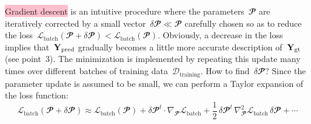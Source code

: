 \documentclass{article}
\begin{document}
\begin{enumerate}
\colorbox{pink}{Gradient descent} is an intuitive procedure where the parameters~$\mathbfcal{P}$ are iteratively corrected by a small vector~$\delta \mathbfcal{P} \ll \mathbfcal{P}$ carefully chosen so as to reduce the loss~$\mathcal{L}_\text{batch} (\mathbfcal{P} + \delta \mathbfcal{P} ) < \mathcal{L}_\text{batch} (\mathbfcal{P})$. Obviously, a decrease in the loss implies that~${\bf Y}_\text{pred}$ gradually becomes a little more accurate description of~${\bf Y}_\text{gt}$ (see point~3).  The minimization is implemented by repeating this update many times over different batches of training data~$\mathcal{D}_\text{training}$.  How to find~$\delta \mathbfcal{P}$?  Since the parameter update is assumed to be small, we can perform a Taylor expansion of the loss function:
\begin{equation*}
\mathcal{L}_\text{batch} ( \mathbfcal{P} + \delta \mathbfcal{P} ) \approx \mathcal{L}_\text{batch} ( \mathbfcal{P} ) + \delta \mathbfcal{P}^t \cdot \nabla_\mathbfcal{P} \mathcal{L}_\text{batch} + \frac{1}{2} \, \delta \mathbfcal{P}^t \, \nabla^2_\mathbfcal{P} \mathcal{L}_\text{batch} \, \delta \mathbfcal{P} + \cdots
\end{equation*}


\end{enumerate}
\end{document}
